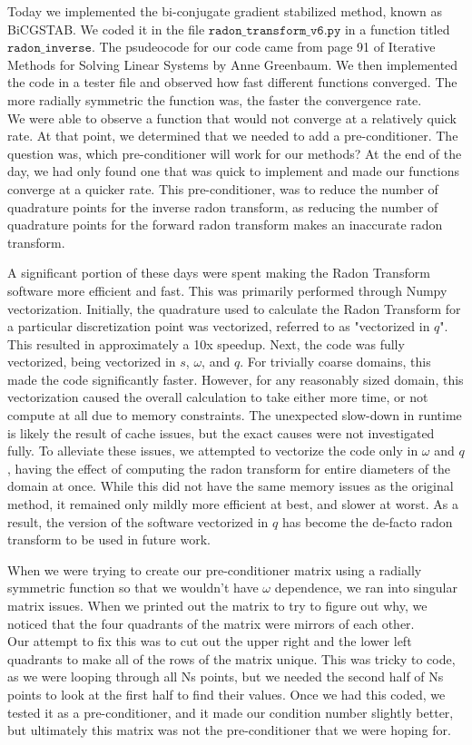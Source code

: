 \documentclass[12pt]{article}
\begin{document}
Today we implemented the bi-conjugate gradient stabilized method, known as BiCGSTAB. We coded it in the file $\texttt{radon\_transform\_v6.py}$ in a function titled $\texttt{radon\_inverse}$. The psudeocode for our code came from page 91 of Iterative Methods for Solving Linear Systems by Anne Greenbaum. We then implemented the code in a tester file and observed how fast different functions converged. The more radially symmetric the function was, the faster the convergence rate. \\
We were able to observe a function that would not converge at a relatively quick rate. At that point, we determined that we needed to add a pre-conditioner. The question was, which pre-conditioner will work for our methods? At the end of the day, we had only found one that was quick to implement and made our functions converge at a quicker rate. This pre-conditioner, was to reduce the number of quadrature points for the inverse radon transform, as reducing the number of quadrature points for the forward radon transform makes an inaccurate radon transform. 

A significant portion of these days were spent making the Radon Transform software more efficient and fast.
This was primarily performed through Numpy vectorization.
Initially, the quadrature used to calculate the Radon Transform for a particular discretization point was vectorized, referred to as "vectorized in $q$".
This resulted in approximately a 10x speedup.
Next, the code was fully vectorized, being vectorized in $s$, $\omega$, and $q$.
For trivially coarse domains, this made the code significantly faster. 
However, for any reasonably sized domain, this vectorization caused the overall calculation to take either more time, or not compute at all due to memory constraints.
The unexpected slow-down in runtime is likely the result of cache issues, but the exact causes were not investigated fully.
To alleviate these issues, we attempted to vectorize the code only in $\omega$ and $q$, having the effect of computing the radon transform for entire diameters of the domain at once.
While this did not have the same memory issues as the original method, it remained only mildly more efficient at best, and slower at worst.
As a result, the version of the software vectorized in $q$ has become the de-facto radon transform to be used in future work.

When we were trying to create our pre-conditioner matrix using a radially symmetric function so that we wouldn't have $\omega$ dependence, we ran into singular matrix issues. When we printed out the matrix to try to figure out why, we noticed that the four quadrants of the matrix were mirrors of each other. \\
Our attempt to fix this was to cut out the upper right and the lower left quadrants to make all of the rows of the matrix unique. This was tricky to code, as we were looping through all Ns points, but we needed the second half of Ns points to look at the first half to find their values. Once we had this coded, we tested it as a pre-conditioner, and it made our condition number slightly better, but ultimately this matrix was not the pre-conditioner that we were hoping for. 
\end{document}
